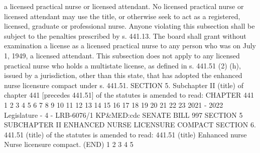 a licensed practical nurse or licensed attendant. No licensed practical nurse or
licensed attendant may use the title, or otherwise seek to act as a registered, licensed,
graduate or professional nurse. Anyone violating this subsection shall be subject to
the penalties prescribed by s. 441.13. The board shall grant without examination a
license as a licensed practical nurse to any person who was on July 1, 1949, a licensed
attendant. This subsection does not apply to any licensed practical nurse who holds
a multistate license, as defined in s. 441.51 (2) (h), issued by a jurisdiction, other than
this state, that has adopted the enhanced nurse licensure compact under s. 441.51.
SECTION 5. Subchapter II (title) of chapter 441 [precedes 441.51] of the statutes
is amended to read:
CHAPTER 441
1
2
3
4
5
6
7
8
9
10
11
12
13
14
15
16
17
18
19
20
21
22
23
2021 - 2022 Legislature - 4 - LRB-6076/1
KP&MED:cdc
 SENATE BILL 997 SECTION 5
SUBCHAPTER II
ENHANCED NURSE LICENSURE COMPACT
SECTION 6. 441.51 (title) of the statutes is amended to read:
441.51 (title) Enhanced nurse Nurse licensure compact.
(END)
1
2
3
4
5